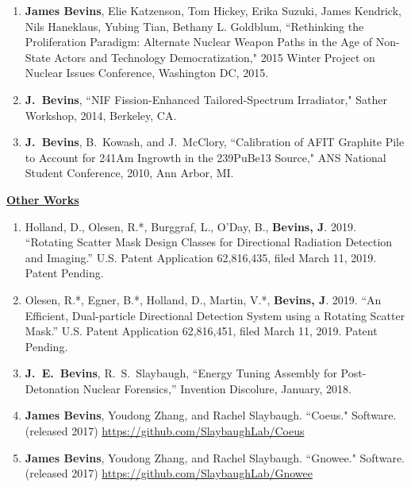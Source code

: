 \begin{enumerate}
  \item \textbf{James Bevins}, Elie Katzenson, Tom Hickey, Erika Suzuki, James Kendrick, Nils Haneklaus, Yubing Tian, Bethany L. Goldblum, ``Rethinking the Proliferation Paradigm: Alternate Nuclear Weapon Paths in the Age of Non-State Actors and Technology Democratization," 2015 Winter Project on Nuclear Issues Conference, Washington DC, 2015.
  
  \item \textbf{J.\ Bevins}, ``NIF Fission-Enhanced Tailored-Spectrum Irradiator," Sather Workshop, 2014, Berkeley, CA.
  
  \item \textbf{J.\ Bevins}, B.\ Kowash, and J.\ McClory, ``Calibration of AFIT Graphite Pile to Account for 241Am Ingrowth in the 239PuBe13 Source," ANS National Student Conference, 2010, Ann Arbor, MI.
\end{enumerate}


\underline{\textbf{Other Works}}

\begin{enumerate}

\item Holland, D., Olesen, R.*, Burggraf, L., O’Day, B., \textbf{Bevins, J}.  2019. ``Rotating Scatter Mask Design Classes for Directional Radiation Detection and Imaging.” U.S. Patent Application 62,816,435, filed March 11, 2019. Patent Pending.

\item Olesen, R.*, Egner, B.*, Holland, D., Martin, V.*, \textbf{Bevins, J}. 2019. ``An Efficient, Dual-particle Directional Detection System using a Rotating Scatter Mask.” U.S. Patent Application 62,816,451, filed March 11, 2019. Patent Pending.

\item \textbf{J.\ E.\ Bevins}, R.\ S.\ Slaybaugh, ``Energy Tuning Assembly for Post-Detonation Nuclear Forensics,” Invention Discolure, January, 2018.

\item \textbf{James Bevins}, Youdong Zhang, and Rachel Slaybaugh. ``Coeus." Software. (released 2017) \url{https://github.com/SlaybaughLab/Coeus} 

\item \textbf{James Bevins}, Youdong Zhang, and Rachel Slaybaugh. ``Gnowee." Software. (released 2017) \url{https://github.com/SlaybaughLab/Gnowee}
\end{enumerate} 
